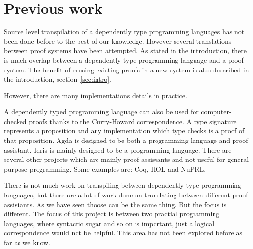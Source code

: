 


\section{Previous work}

Source level transpilation of a dependently type programming languages has not
been done before to the best of our knowledge.
However several translations between proof systems have been attempted. As
stated in the introduction, there is much overlap between a dependently type
programming language and a proof system.
The benefit of reusing existing proofs in a new system is also described in
the introduction, section~\ref{sec:intro}.

However, there are many implementations details in practice.

A dependently typed programming language can also be used for computer-checked
proofs thanks to the Curry-Howard correspondence. A type signature represents
a proposition and any implementation which type checks is a proof of that
proposition. Agda is designed to be both a programming language and proof
assistant. Idris is mainly designed to be a programming language. There are
several other projects which are mainly proof assistants and not useful for
general purpose programming. Some examples are: Coq, HOL and NuPRL.

There is not much work on transpiling between dependently type programming
languages, but there are a lot of work done on translating between different
proof assistants. As we have seen thoose can be the same thing. But the focus
is different. The focus of this project is between two practial programming
languages, where syntactic sugar and so on is important, just a logical
correspondence would not be helpful. This area has not been explored before as
far as we know.

